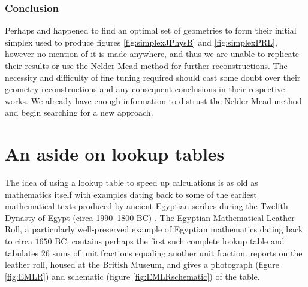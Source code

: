 \subsubsection*{Conclusion}
Perhaps \citet{Brichta07} and \citet{Bocharova11} happened to find an optimal set of geometries to form their initial simplex used to produce figures \ref{fig:simplexJPhysB} and \ref{fig:simplexPRL}, however no mention of it is made anywhere, and thus we are unable to replicate their results or use the Nelder-Mead method for further reconstructions. The necessity and difficulty of fine tuning required should cast some doubt over their geometry reconstructions and any consequent conclusions in their respective works. We already have enough information to distrust the Nelder-Mead method and begin searching for a new approach.

\section{An aside on lookup tables}
The idea of using a lookup table to speed up calculations is as old as mathematics itself with examples dating back to some of the earliest mathematical texts produced by ancient Egyptian scribes during the Twelfth Dynasty of Egypt (circa 1990--1800 BC) \citep[p. 1, footnote 4]{Neugebauer45}. The Egyptian Mathematical Leather Roll, a particularly well-preserved example of Egyptian mathematics dating back to circa $1650$ BC, contains perhaps the first such complete lookup table and tabulates 26 sums of unit fractions equaling another unit fraction. \citet{Glanville27} reports on the leather roll, housed at the British Museum, and gives a photograph (figure \ref{fig:EMLR}) and schematic (figure \ref{fig:EMLRschematic}) of the table. 


